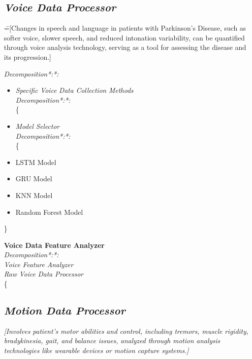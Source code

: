 \documentclass[a4paper,10pt,twocolumn]{article}
\begin{document}
\subsection*{\textit{Voice Data Processor}}
\==[Changes in speech and language in patients with
Parkinson’s Disease, such as softer voice, slower
speech, and reduced intonation variability, can be
quantified through voice analysis technology, serving
as a tool for assessing the disease and its progression.]


\Rightarrow \textit{Decomposition*:*:} 
    \begin{itemize}
      \{  \item \bullet \textit{Specific Voice Data Collection Methods}\\
       \Rightarrow \textit{Decomposition*:*:} \\
            
              \{ \bullet  \item \textit{Model Selector}\\
                 \Rightarrow \textit{Decomposition*:*:} \\
                
                    
\{ \bullet    \item LSTM Model\\
\bullet    \item GRU Model\\
\bullet     \item KNN Model\\
\bullet      \item Random Forest Model\\
\end{itemize}
                \} \\
              \bullet  \item \textbf{Voice Data Feature Analyzer} \\
                 \Rightarrow \textit{Decomposition*:*:}\\
        \bullet \textit{Voice Feature Analyzer}\\
        \bullet \textit{ Raw Voice Data Processor}\\
                \{ 
                    
                
        
    


 \subsection*{\textbf{\textit{{Motion Data Processor}}}}
\textit{[Involves patient's motor abilities and control, including tremors, muscle rigidity, bradykinesia, gait, and balance issues, analyzed through motion analysis technologies like wearable devices or motion capture systems.]}
\end{document}

